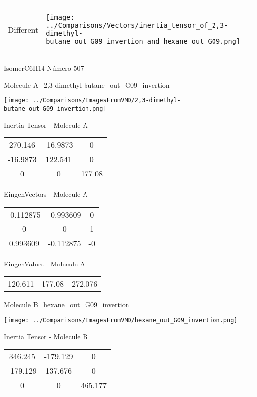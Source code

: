 \vtab[-5mm]
\begin{tabular}{*{2}{m{}}}
\begin{center}
\textcolor{NavyBlue}{\Large Different}
\end{center}
&
\begin{center}
\texttt{[image: ../Comparisons/Vectors/inertia\_tensor\_of\_2,3-dimethyl-butane\_out\_G09\_invertion\_and\_hexane\_out\_G09.png]}
\end{center}
\end{tabular}

 \newpage

\vtab[-3cm]
\begin{center}
{\large IsomerC6H14 \tab Número 507}
\end{center}
\begin{multicols}{2}
\begin{center}

Molecule A \
2,3-dimethyl-butane\_out\_G09\_invertion

\texttt{[image: ../Comparisons/ImagesFromVMD/2,3-dimethyl-butane\_out\_G09\_invertion.png]}

Inertia Tensor - Molecule A \\
\begin{tabular}{|c c c|}
270.146	 & 	-16.9873	 & 	0	 \\
-16.9873	 & 	122.541	 & 	0	 \\
0	 & 	0	 & 	177.08
\end{tabular}

\vtab
 EingenVectors - Molecule A     \\
\begin{tabular}{|c c c|}
-0.112875	 & 	-0.993609	 & 	0	 \\
0	 & 	0	 & 	1	 \\
0.993609	 & 	-0.112875	 & 	-0
\end{tabular}

\vtab
 EingenValues - Molecule A     \\
\begin{tabular}{|c c c|}
120.611	 & 	177.08	 & 	272.076	 \\
\end{tabular}
\columnbreak

Molecule B \
hexane\_out\_G09\_invertion

\texttt{[image: ../Comparisons/ImagesFromVMD/hexane\_out\_G09\_invertion.png]}

Inertia Tensor - Molecule B \\
\begin{tabular}{|c c c|}
346.245	 & 	-179.129	 & 	0	 \\
-179.129	 & 	137.676	 & 	0	 \\
0	 & 	0	 & 	465.177
\end{tabular}


\end{center}
\end{multicols}
